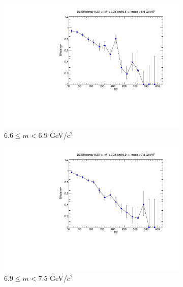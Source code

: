 \begin{figure}[p]
\begin{subfigure}[b]{0.32\textwidth}
        \includegraphics[width=\textwidth]{./kTrackerEfficiencyPlots/D2_Efficiency_xF6_mass8.pdf}
        \caption{$6.6 \leq m < 6.9$ GeV/$c^2$}
        \label{fig:xF6_mass8}
    \end{subfigure}
    \vspace{0.5cm}
    \begin{subfigure}[b]{0.32\textwidth}
        \centering
        \includegraphics[width=\textwidth]{./kTrackerEfficiencyPlots/D2_Efficiency_xF6_mass9.pdf}
        \caption{$6.9 \leq m < 7.5$ GeV/$c^2$}
        \label{fig:xF6_mass9}
    \end{subfigure}
    \hfill
    \begin{subfigure}[b]{0.32\textwidth}
        \centering

\end{subfigure}
\end{figure}
